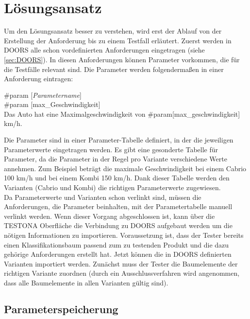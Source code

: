 \chapter{Lösungsansatz}\label{chp:loesungsansatz}

Um  den Lösungsansatz besser zu verstehen, wird erst der Ablauf von der Erstellung der Anforderung bis zu einem Testfall erläutert. Zuerst werden in DOORS alle schon vordefinierten Anforderungen eingetragen (siehe \ref{sec:DOORS}). In diesen Anforderungen können Parameter vorkommen, die für die Testfälle relevant sind. Die Parameter werden folgendermaßen in einer Anforderung eintragen:\\

\begin{center}
\#param [\textit{Parametername}]\\
\#param [max\_Geschwindigkeit]\\
Das Auto hat eine Maximalgeschwindigkeit von \#param[max\_geschwindigkeit] km/h.
\end{center}

Die Parameter sind in einer Parameter-Tabelle definiert, in der die jeweiligen Parameterwerte eingetragen werden. Es gibt eine gesonderte Tabelle für Parameter, da die Parameter in der Regel pro Variante verschiedene Werte annehmen. Zum Beispiel beträgt die maximale Geschwindigkeit bei einem Cabrio 100 km/h  und bei einem Kombi 150 km/h. Dank dieser Tabelle werden den Varianten (Cabrio und Kombi) die richtigen Parameterwerte zugewiesen.\\


Da Parameterwerte und Varianten schon verlinkt sind, müssen die Anforderungen, die Parameter beinhalten, mit der Parametertabelle manuell verlinkt werden. Wenn dieser Vorgang abgeschlossen ist, kann über die TESTONA Oberfläche die Verbindung zu DOORS aufgebaut werden um die nötigen Informationen zu importieren. Voraussetzung ist, dass der Tester bereits einen Klassifikationsbaum passend zum zu testenden Produkt und die dazu gehörige Anforderungen erstellt hat. Jetzt können die in DOORS definierten Varianten importiert werden. Zunächst muss der Tester die Baumelemente der richtigen Variante zuordnen (durch ein Ausschlussverfahren wird angenommen, dass alle Baumelemente in allen Varianten gültig sind). 


\newpage
\section{Parameterspeicherung}\label{sec.parameterspeicherung}
